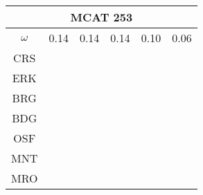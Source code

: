 \documentclass[a4paper,12pt]{article}
\begin{document}
\begin{tabular}{|c|c|c|c|c|c|} %
         \hline \multicolumn{6}{|c|}{MCAT 253} \\ \hline
         $\omega$&0.14&0.14&0.14&0.10&0.06 \\ \hline %
        CRS&\cellcolor[HTML]{E41A1C}&\cellcolor[HTML]{E41A1C}&\cellcolor[HTML]{E41A1C}&\cellcolor[HTML]{E41A1C}&\cellcolor[HTML]{E41A1C}\\ \hline %
        ERK&\cellcolor[HTML]{377EB8}&\cellcolor[HTML]{E41A1C}&\cellcolor[HTML]{E41A1C}&\cellcolor[HTML]{E41A1C}&\cellcolor[HTML]{377EB8}\\ \hline %
        BRG&\cellcolor[HTML]{4DAF4A}&\cellcolor[HTML]{377EB8}&\cellcolor[HTML]{377EB8}&\cellcolor[HTML]{377EB8}&\cellcolor[HTML]{4DAF4A}\\ \hline %
        BDG&\cellcolor[HTML]{4DAF4A}&\cellcolor[HTML]{377EB8}&\cellcolor[HTML]{377EB8}&\cellcolor[HTML]{377EB8}&\cellcolor[HTML]{4DAF4A}\\ \hline %
        OSF&\cellcolor[HTML]{984EA3}&\cellcolor[HTML]{4DAF4A}&\cellcolor[HTML]{4DAF4A}&\cellcolor[HTML]{4DAF4A}&\cellcolor[HTML]{984EA3}\\ \hline %
        MNT&\cellcolor[HTML]{984EA3}&\cellcolor[HTML]{4DAF4A}&\cellcolor[HTML]{4DAF4A}&\cellcolor[HTML]{4DAF4A}&\cellcolor[HTML]{984EA3}\\ \hline %
        MRO&\cellcolor[HTML]{984EA3}&\cellcolor[HTML]{4DAF4A}&\cellcolor[HTML]{4DAF4A}&\cellcolor[HTML]{4DAF4A}&\cellcolor[HTML]{984EA3}\\ \hline %

\end{tabular}
\end{document}
